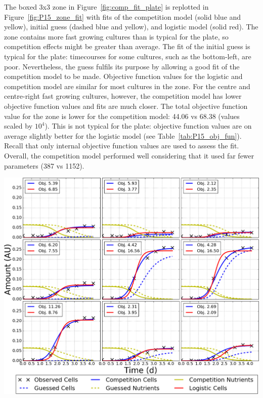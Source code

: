 The boxed 3x3 zone in Figure~\ref{fig:comp_fit_plate} is replotted in
Figure~\ref{fig:P15_zone_fit} with fits of the competition model
(solid blue and yellow), initial guess (dashed blue and yellow), and
logistic model (solid red). The zone contains more fast growing
cultures than is typical for the plate, so competition effects might
be greater than average.
The fit of the initial guess is typical for the plate: timecourses for
some cultures, such as the bottom-left, are poor. Nevertheless, the
guess fulfils its purpose by allowing a good fit of the competition
model to be made. Objective function values for the logistic and
competition model are similar for most cultures in the zone. For the
centre and centre-right fast growing cultures, however, the
competition model has lower objective function values and fits are
much closer. The total objective function value for the zone is lower
for the competition model: 44.06 vs 68.38 (values scaled by
\(10^{4}\)). This is not typical for the plate: objective function
values are on average slightly better for the logistic model (see
Table~\ref{tab:P15_obj_fun}). Recall that only internal objective
function values are used to assess the fit. Overall, the competition
model performed well considering that it used far fewer parameters
(387 vs 1152).

\graphicspath{{images/p15_fits/}}
\begin{Figure}
  \centering
  \includegraphics[width=\linewidth]{final/zone_r5_c18_with_obj_fun_2}
  \label{fig:P15_zone_fit}
\end{Figure}

